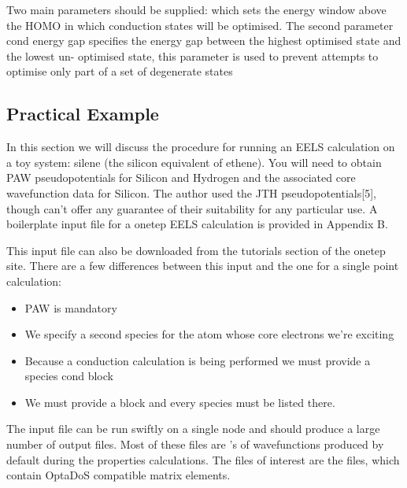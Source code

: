 \documentclass[letterpaper,10pt,english]{sphinxmanual}
\begin{document}
Two main parameters should be supplied:  which sets the
energy window above the HOMO in which conduction states will be optimised.
The second parameter cond energy gap
specifies the energy gap between the highest optimised state and the lowest un-
optimised state, this parameter is used to prevent attempts to optimise only
part of a set of degenerate states


\subsection{Practical Example}
\label{\detokenize{eels_in_onetep:practical-example}}
In this section we will discuss the procedure for running an EELS calculation
on a toy system: silene (the silicon equivalent of ethene). You will need to
obtain PAW pseudopotentials for Silicon and Hydrogen and the associated core
wavefunction data for Silicon. The author used the JTH pseudopotentials{[}5{]},
though can’t offer any guarantee of their suitability for any particular use.
A boilerplate input file for a onetep EELS calculation is provided in Appendix B.

This input file can also be downloaded from the tutorials section of the
onetep site. There are a few differences between this input and the one for a
single point calculation:
\begin{itemize}
\item {} 
PAW is mandatory

\item {} 
We specify a second species for the atom whose core electrons we’re exciting

\item {} 
Because a conduction calculation is being performed we must provide a species cond block

\item {} 
We must provide a  block and every species must be listed there.

\end{itemize}

The input file can be run swiftly on a single node and should produce a
large number of output files. Most of these files are ’s of wavefunctions
produced by default during the properties calculations. The files of interest
are the  files, which contain OptaDoS compatible matrix elements.
\end{document}
